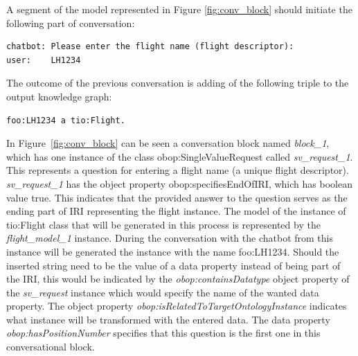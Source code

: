 \documentclass[runningheads]{llncs}
\begin{document}
A segment of the model represented in Figure \ref{fig:conv_block} should initiate the following part of conversation:
\begin{lstlisting}[basicstyle=\small,  xleftmargin=0.7cm ]
chatbot: Please enter the flight name (flight descriptor):
user:    LH1234
\end{lstlisting}
The outcome of the previous conversation is adding of the following triple to the output knowledge graph:
\begin{lstlisting}[basicstyle=\small,  xleftmargin=0.7cm ]
foo:LH1234 a tio:Flight. 
\end{lstlisting}
In Figure~\ref{fig:conv_block} can be seen a conversation block named \textit{block\_1}, which has one instance of the class obop:SingleValueRequest called \textit{sv\_request\_1}. This represents a question for entering a flight name (a unique flight descriptor). \textit{sv\_request\_1} has the object property obop:specifiesEndOfIRI, which has boolean value true. This indicates that the provided answer to the question serves as the ending part of IRI representing the flight instance. The model of the instance of tio:Flight class that will be generated in this process is represented by the \textit{flight\_model\_1} instance. During the conversation with the chatbot from this instance will be generated the instance with the name foo:LH1234. Should the inserted string need to be the value of a data property instead of being part of the IRI, this would be indicated by the \textit{obop:containsDatatype} object property of the \textit{sv\_request} instance which would specify the name of the wanted data property. The object property \textit{obop:isRelatedToTargetOntologyInstance} indicates what instance will be transformed with the entered data. The data property \textit{obop:hasPositionNumber} specifies that this question is the first one in this conversational block.  


\FloatBarrier
\end{document}

